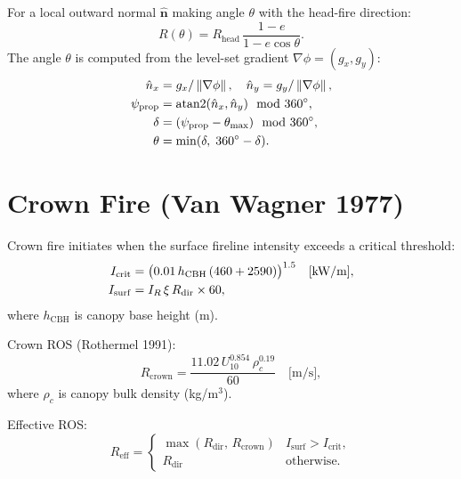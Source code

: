 \documentclass[11pt,twocolumn]{article}
\newcommand{\norm}[1]{\left\lVert#1\right\rVert}
\begin{document}
For a local outward normal $\hat{\mathbf{n}}$ making angle $\theta$
with the head-fire direction:
\begin{equation}
  R(\theta) = R_{\mathrm{head}}\,\frac{1-e}{1-e\cos\theta}.\label{eq:Rtheta}
\end{equation}
The angle $\theta$ is computed from the level-set gradient
$\nabla\phi = (g_x, g_y)$:
\begin{align}
  \hat{n}_x &= g_x/\norm{\nabla\phi},\quad \hat{n}_y = g_y/\norm{\nabla\phi},\notag\\
  \psi_{\mathrm{prop}} &= \operatorname{atan2}(\hat{n}_x,\hat{n}_y)\mod360^\circ,\notag\\
  \delta &= (\psi_{\mathrm{prop}}-\theta_{\max})\mod360^\circ,\notag\\
  \theta &= \min(\delta,\;360^\circ-\delta).\label{eq:theta}
\end{align}

\section{Crown Fire (Van Wagner 1977)}
\label{sec:crown}

Crown fire initiates when the surface fireline intensity exceeds a
critical threshold:
\begin{align}
  I_{\mathrm{crit}} &= \bigl(0.01\,h_{\mathrm{CBH}}\,(460+2590)\bigr)^{1.5}
                      \quad\text{[kW/m]},\label{eq:Icrit}\\
  I_{\mathrm{surf}} &= I_R\,\xi\,R_{\mathrm{dir}}\times 60,\notag
\end{align}
where $h_{\mathrm{CBH}}$ is canopy base height (m).

Crown ROS (Rothermel 1991):
\begin{equation}
  R_{\mathrm{crown}} = \frac{11.02\,U_{10}^{0.854}\,\rho_c^{0.19}}{60}
                       \quad\text{[m/s]},\label{eq:Rcrown}
\end{equation}
where $\rho_c$ is canopy bulk density (kg/m$^3$).

Effective ROS:
\begin{equation}
  R_{\mathrm{eff}} = \begin{cases}
    \max(R_{\mathrm{dir}},\,R_{\mathrm{crown}}) & I_{\mathrm{surf}} > I_{\mathrm{crit}},\\
    R_{\mathrm{dir}} & \text{otherwise.}
  \end{cases}\label{eq:Reff}
\end{equation}
\end{document}
